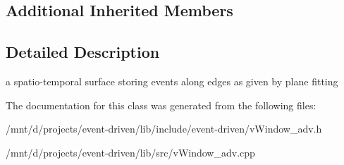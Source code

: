 \subsection*{Additional Inherited Members}


\subsection{Detailed Description}
a spatio-\/temporal surface storing events along edges as given by plane fitting 

The documentation for this class was generated from the following files\+:\begin{DoxyCompactItemize}
\item 
/mnt/d/projects/event-\/driven/lib/include/event-\/driven/v\+Window\+\_\+adv.\+h\item 
/mnt/d/projects/event-\/driven/lib/src/v\+Window\+\_\+adv.\+cpp\end{DoxyCompactItemize}
